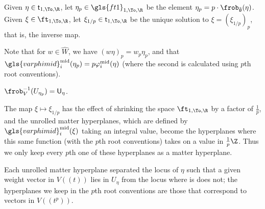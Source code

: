 \begin{definition}
  Given $\eta\in \mathsf{t}_{1,\To,\R} $, let $\eta_p\in\gls{ft1}_{1,\To,\R}$ be the
  element  $\eta_p=p\cdot \frob_{\mathfrak{\tilde{g}}}(\eta)$.  Given
  $\xi\in \ft_{1,\To,\R}$, let  $\xi_{1/p}\in \mathsf{t}_{1,\To,\R}$ be the unique solution to $\xi=(\xi_{1/p})_p$, that is, the inverse map.
\end{definition}
Note that for $w\in \widehat{W}$, we have $(w\eta)_p=w_p\eta_p$, and that $\gls{varphimid}^{\operatorname{mid}}_i(\eta_p)=p\mathsf{\varphi}^{\operatorname{mid}}_i(\eta)$ (where the second is calculated using $p$th root conventions).
\begin{lemma}
  $\frob_V^{-1}(U_{\eta_p})=\mathsf{U}_{\eta}$.
\end{lemma}
\begin{remark}
  The map $\xi\mapsto \xi_{1/p}$ has the effect of shrinking the space
  $\ft_{1,\To,\R}$ by a factor of $\frac{1}{p}$, and the unrolled matter
  hyperplanes, which are defined by  $\gls{varphimid}_i^{\operatorname{mid}}(\xi)$ taking an
  integral value, become the hyperplanes where this same function
  (with the $p$th root conventions)  takes on a value in
  $\frac{1}{p}\Z$.  Thus we only keep every $p$th one of these
  hyperplanes as a matter hyperplane.

  Each unrolled matter hyperplane separated the locus of $\eta$ such
  that a given weight vector in $V((t))$ lies in $U_\eta$ from the
  locus where is does not; the hyperplanes we keep in the $p$th root
  conventions are those that correspond to vectors in $V((t^p))$.
\end{remark}

